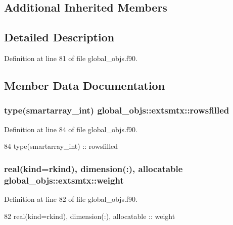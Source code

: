 \subsection*{Additional Inherited Members}


\subsection{Detailed Description}


Definition at line 81 of file global\+\_\+objs.\+f90.



\subsection{Member Data Documentation}
\subsubsection[{rowsfilled}]{\setlength{\rightskip}{0pt plus 5cm}type({\bf smartarray\+\_\+int}) global\+\_\+objs\+::extsmtx\+::rowsfilled}\label{structglobal__objs_1_1extsmtx_a8b5b61c01ea2274b2f1fafa304287cb2}


Definition at line 84 of file global\+\_\+objs.\+f90.


\begin{DoxyCode}
84     \textcolor{keywordtype}{type}(smartarray_int) :: rowsfilled
\end{DoxyCode}
\subsubsection[{weight}]{\setlength{\rightskip}{0pt plus 5cm}real(kind=rkind), dimension(\+:), allocatable global\+\_\+objs\+::extsmtx\+::weight}\label{structglobal__objs_1_1extsmtx_a237adef481c2a29c10e8d7610f9a688b}


Definition at line 82 of file global\+\_\+objs.\+f90.


\begin{DoxyCode}
82     \textcolor{keywordtype}{real(kind=rkind)}, \textcolor{keywordtype}{dimension(:)}, \textcolor{keywordtype}{allocatable} :: weight
\end{DoxyCode}
